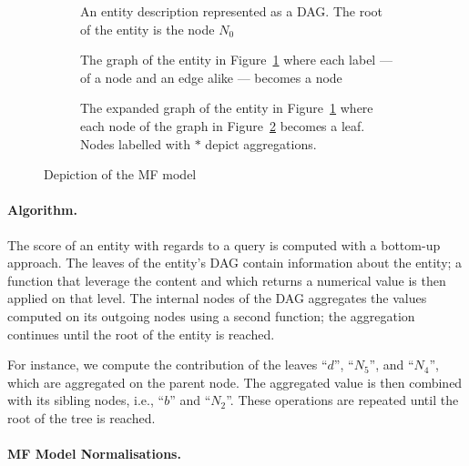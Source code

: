 \begin{figure}
	\centering
	\begin{subfigure}{.3\textwidth}
		\centering
		\resizebox{\textwidth}{!}{
			
		}
		\caption{An entity description represented as a DAG. The root of the entity is the node $N_0$}
		\label{fig:concept-tree}
	\end{subfigure}
	\quad
	\begin{subfigure}{.3\textwidth}
		\centering
		\resizebox{\textwidth}{!}{
			
		}
		\caption{The graph of the entity in Figure~\ref{fig:concept-tree} where each label --- of a node and an edge alike --- becomes a node}
		\label{fig:expanded-graph1}
	\end{subfigure}
	\qquad
	\begin{subfigure}{.7\textwidth}
		\centering
		\resizebox{\textwidth}{!}{
			
		}
		\caption{The expanded graph of the entity in Figure~\ref{fig:concept-tree} where each node of the graph in Figure~\ref{fig:expanded-graph1} becomes a leaf. Nodes labelled with $*$ depict aggregations.}
		\label{fig:expanded-graph2}
	\end{subfigure}
	\caption[Depiction of the MF model]{Depiction of the \gls{MF} model}
\end{figure}

\paragraph{Algorithm.}

The score of an entity with regards to a query is computed with a bottom-up approach. The leaves of the entity's DAG contain information about the entity; a function that leverage the content and which returns a numerical value is then applied on that level. The internal nodes of the DAG aggregates the values computed on its outgoing nodes using a second function; the aggregation continues until the root of the entity is reached.

For instance, we compute the contribution of the leaves ``$d$'', ``$N_5$'', and ``$N_4$'', which are aggregated on the parent node. The aggregated value is then combined with its sibling nodes, i.e., ``$b$'' and ``$N_2$''. These operations are repeated until the root of the tree is reached.

\paragraph{MF Model Normalisations.}
\label{chap:tree-ranking:mf-model:norm}


